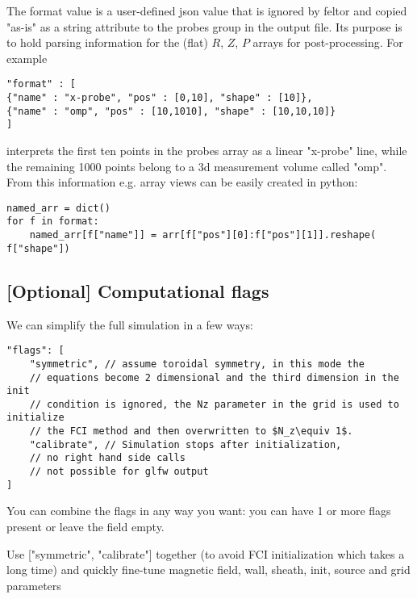 The format value is a user-defined json value that is ignored by feltor and
copied "as-is" as a string attribute to the probes group in the output file.
Its purpose is to hold parsing information for the (flat) $R$, $Z$, $P$ arrays
for post-processing. For example
\begin{verbatim}
"format" : [
{"name" : "x-probe", "pos" : [0,10], "shape" : [10]},
{"name" : "omp", "pos" : [10,1010], "shape" : [10,10,10]}
]
\end{verbatim}
interprets the first ten points in the probes array as a linear "x-probe" line,
while the remaining 1000 points belong to a 3d measurement volume called "omp".
From this information e.g. array views can be easily created in python:
\begin{verbatim}
named_arr = dict()
for f in format:
    named_arr[f["name"]] = arr[f["pos"][0]:f["pos"][1]].reshape( f["shape"])
\end{verbatim}

\subsection{[Optional] Computational flags}
We can simplify the full simulation in a few ways:
\begin{verbatim}
"flags": [
    "symmetric", // assume toroidal symmetry, in this mode the
    // equations become 2 dimensional and the third dimension in the init
    // condition is ignored, the Nz parameter in the grid is used to initialize
    // the FCI method and then overwritten to $N_z\equiv 1$.
    "calibrate", // Simulation stops after initialization,
    // no right hand side calls
    // not possible for glfw output
]
\end{verbatim}
You can combine the flags in any way you want: you can have 1 or more
flags present or leave the field empty.
\begin{tcolorbox}[title=Note]
    Use ["symmetric", "calibrate"] together (to avoid FCI initialization
    which takes a long time) and quickly fine-tune
    magnetic field, wall, sheath, init, source and grid parameters
\end{tcolorbox}

